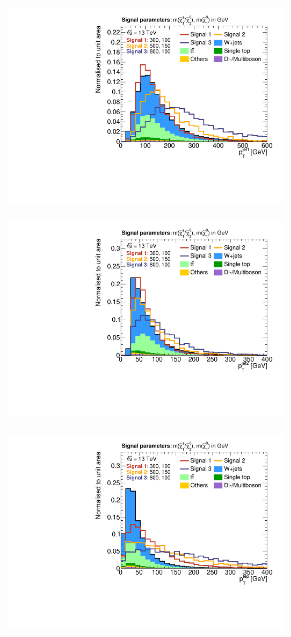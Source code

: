 \begin{figure}
	\centering
	\begin{subfigure}[b]{0.5\linewidth}
		\centering\includegraphics[width=0.8\textwidth]{presel/jet1Pt}
	\end{subfigure}\hfill
	\begin{subfigure}[b]{0.5\linewidth}
		\centering\includegraphics[width=0.8\textwidth]{presel/jet2Pt}
	\end{subfigure}\hfill
	\par\medskip
	\begin{subfigure}[b]{0.5\linewidth}
		\centering\includegraphics[width=0.8\textwidth]{presel/lep1Pt}

\end{subfigure}
\end{figure}
